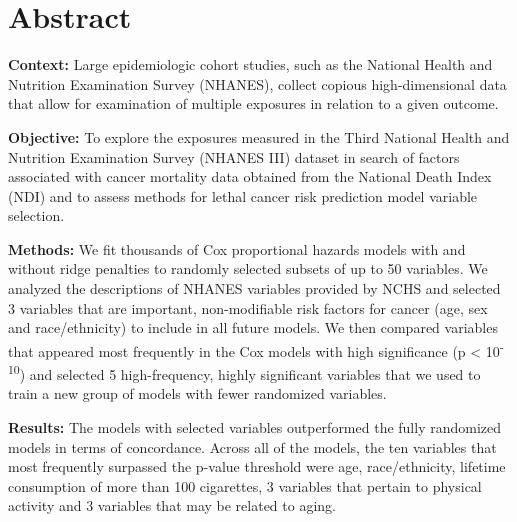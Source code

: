 \documentclass[12pt,twoside]{reedthesis}
\title{}
\author{}
\date{}
\theoremstyle{definition}
\theoremstyle{definition}
\theoremstyle{definition}
\theoremstyle{remark}
\begin{document}

\frontmatter %
\pagestyle{empty} %



  \hypersetup{linkcolor=black}
  \setcounter{tocdepth}{2}
  \tableofcontents





\mainmatter %
\pagestyle{fancyplain} %

\hypertarget{abstract}{%
\section{Abstract}\label{abstract}}

\textbf{Context:} Large epidemiologic cohort studies, such as the
National Health and Nutrition Examination Survey (NHANES), collect
copious high-dimensional data that allow for examination of multiple
exposures in relation to a given outcome.

\textbf{Objective:} To explore the exposures measured in the Third
National Health and Nutrition Examination Survey (NHANES III) dataset in
search of factors associated with cancer mortality data obtained from
the National Death Index (NDI) and to assess methods for lethal cancer
risk prediction model variable selection.

\textbf{Methods:} We fit thousands of Cox proportional hazards models
with and without ridge penalties to randomly selected subsets of up to
50 variables. We analyzed the descriptions of NHANES variables provided
by NCHS and selected 3 variables that are important, non-modifiable risk
factors for cancer (age, sex and race/ethnicity) to include in all
future models. We then compared variables that appeared most frequently
in the Cox models with high significance (p \textless{}
10\textsuperscript{-10}) and selected 5 high-frequency, highly
significant variables that we used to train a new group of models with
fewer randomized variables.

\textbf{Results:} The models with selected variables outperformed the
fully randomized models in terms of concordance. Across all of the
models, the ten variables that most frequently surpassed the p-value
threshold were age, race/ethnicity, lifetime consumption of more than
100 cigarettes, 3 variables that pertain to physical activity and 3
variables that may be related to aging.
\end{document}
